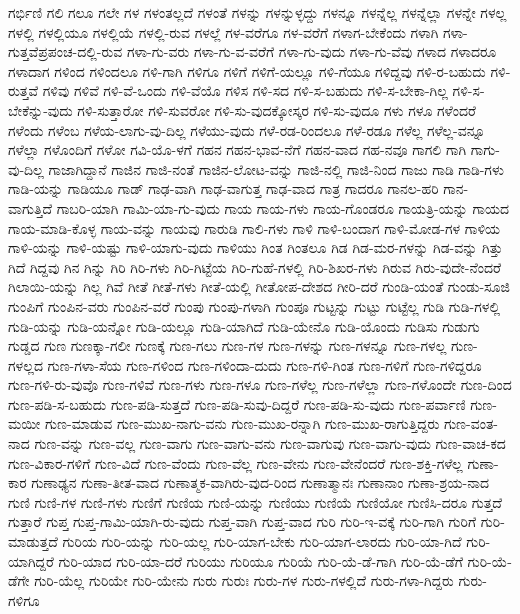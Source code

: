 {ಗರ್ಭಿಣಿ
ಗಲಿ
ಗಲೂ
ಗಲೇ
ಗಳ
ಗಳಂತಲ್ಲದೆ
ಗಳಂತೆ
ಗಳನ್ನು
ಗಳನ್ನುಳ್ಳದ್ದು
ಗಳನ್ನೂ
ಗಳನ್ನೆಲ್ಲ
ಗಳನ್ನೆಲ್ಲಾ
ಗಳನ್ನೇ
ಗಳಲ್ಲ
ಗಳಲ್ಲಿ
ಗಳಲ್ಲಿಯೂ
ಗಳಲ್ಲಿಯೆ
ಗಳಲ್ಲಿ-ರುವ
ಗಳಲ್ಲೆ
ಗಳ-ವರೆಗೂ
ಗಳ-ವರೆಗೆ
ಗಳಾಗ-ಬೇಕೆಂದು
ಗಳಾಗಿ
ಗಳಾ-ಗುತ್ತವೆಪ್ರಪಂಚ-ದಲ್ಲಿ-ರುವ
ಗಳಾ-ಗು-ವರು
ಗಳಾ-ಗು-ವ-ವರೆಗೆ
ಗಳಾ-ಗು-ವುದು
ಗಳಾ-ಗು-ವೆವು
ಗಳಾದ
ಗಳಾದರೂ
ಗಳಾದಾಗ
ಗಳಿಂದ
ಗಳಿಂದಲೂ
ಗಳಿ-ಗಾಗಿ
ಗಳಿಗೂ
ಗಳಿಗೆ
ಗಳಿಗೆ-ಯಲ್ಲೂ
ಗಳಿ-ಗೆಯೂ
ಗಳಿದ್ದವು
ಗಳಿ-ರ-ಬಹುದು
ಗಳಿ-ರುತ್ತವೆ
ಗಳಿವು
ಗಳಿವೆ
ಗಳಿ-ವೆ-ಒಂದು
ಗಳಿ-ವೆಯೊ
ಗಳಿಸ
ಗಳಿ-ಸದ
ಗಳಿ-ಸ-ಬಹುದು
ಗಳಿ-ಸ-ಬೇಕಾ-ಗಿಲ್ಲ
ಗಳಿ-ಸ-ಬೇಕೆನ್ನು-ವುದು
ಗಳಿ-ಸುತ್ತಾರೋ
ಗಳಿ-ಸುವರೋ
ಗಳಿ-ಸು-ವುದಕ್ಕೋಸ್ಕರ
ಗಳಿ-ಸು-ವುದೂ
ಗಳು
ಗಳೂ
ಗಳೆಂದರೆ
ಗಳೆಂದು
ಗಳೆಂಬ
ಗಳೆಯ-ಲಾಗು-ವು-ದಿಲ್ಲ
ಗಳೆಯು-ವುದು
ಗಳೆ-ರಡ-ರಿಂದಲೂ
ಗಳೆ-ರಡೂ
ಗಳೆಲ್ಲ
ಗಳೆಲ್ಲ-ವನ್ನೂ
ಗಳೆಲ್ಲಾ
ಗಳೊಂದಿಗೆ
ಗಳೋ
ಗವಿ-ಯೊ-ಳಗೆ
ಗಹನ
ಗಹನ-ಭಾವ-ನೆಗೆ
ಗಹನ-ವಾದ
ಗಹ-ನವೂ
ಗಾಗಲಿ
ಗಾಗಿ
ಗಾಗು-ವು-ದಿಲ್ಲ
ಗಾಜಾಗಿದ್ದಾನೆ
ಗಾಜಿನ
ಗಾಜಿ-ನಂತೆ
ಗಾಜಿನ-ಲೋಟ-ವನ್ನು
ಗಾಜಿ-ನಲ್ಲಿ
ಗಾಜಿ-ನಿಂದ
ಗಾಜು
ಗಾಡಿ
ಗಾಡಿ-ಗಳು
ಗಾಡಿ-ಯನ್ನು
ಗಾಡಿಯೂ
ಗಾಡ್
ಗಾಢ-ವಾಗಿ
ಗಾಢ-ವಾಗುತ್ತ
ಗಾಢ-ವಾದ
ಗಾತ್ರ
ಗಾದರೂ
ಗಾನಲ-ಹರಿ
ಗಾನ-ವಾಗುತ್ತಿದೆ
ಗಾಬರಿ-ಯಾಗಿ
ಗಾಮಿ-ಯಾ-ಗು-ವುದು
ಗಾಯ
ಗಾಯ-ಗಳು
ಗಾಯ-ಗೊಂಡರೂ
ಗಾಯತ್ರಿ-ಯನ್ನು
ಗಾಯದ
ಗಾಯ-ಮಾಡಿ-ಕೊಳ್ಳ
ಗಾಯ-ವನ್ನು
ಗಾಯವು
ಗಾರುಡಿ
ಗಾಲಿ-ಗಳು
ಗಾಳಿ
ಗಾಳಿ-ಬಂದಾಗ
ಗಾಳಿ-ಮೋಡ-ಗಳ
ಗಾಳಿಯ
ಗಾಳಿ-ಯನ್ನು
ಗಾಳಿ-ಯಷ್ಟು
ಗಾಳಿ-ಯಾಗು-ವುದು
ಗಾಳಿಯು
ಗಿಂತ
ಗಿಂತಲೂ
ಗಿಡ
ಗಿಡ-ಮರ-ಗಳನ್ನು
ಗಿಡ-ವನ್ನು
ಗಿತ್ತು
ಗಿದೆ
ಗಿದ್ದವು
ಗಿನ
ಗಿನ್ನು
ಗಿರಿ
ಗಿರಿ-ಗಳು
ಗಿರಿ-ಗಿಟ್ಟೆಯ
ಗಿರಿ-ಗುಹೆ-ಗಳಲ್ಲಿ
ಗಿರಿ-ಶಿಖರ-ಗಳು
ಗಿರುವ
ಗಿರು-ವುದೇ-ನೆಂದರೆ
ಗಿಲಾಯಿ-ಯನ್ನು
ಗಿಲ್ಲ
ಗಿವೆ
ಗೀತೆ
ಗೀತೆ-ಗಳು
ಗೀತೆ-ಯಲ್ಲಿ
ಗೀತೋಪ-ದೇಶದ
ಗೀರಿ-ದರೆ
ಗುಂಡಿ-ಯಂತೆ
ಗುಂಡು-ಸೂಜಿ
ಗುಂಪಿಗೆ
ಗುಂಪಿನ-ವರು
ಗುಂಪಿನ-ವರೆ
ಗುಂಪು
ಗುಂಪು-ಗಳಾಗಿ
ಗುಂಪೂ
ಗುಟ್ಟನ್ನು
ಗುಟ್ಟು
ಗುಟ್ಟೆಲ್ಲ
ಗುಡಿ
ಗುಡಿ-ಗಳಲ್ಲಿ
ಗುಡಿ-ಯನ್ನು
ಗುಡಿ-ಯನ್ನೋ
ಗುಡಿ-ಯಲ್ಲೂ
ಗುಡಿ-ಯಾಗಿದೆ
ಗುಡಿ-ಯೇನೊ
ಗುಡಿ-ಯೊಂದು
ಗುಡಿಸು
ಗುಡುಗು
ಗುಡ್ಡದ
ಗುಣ
ಗುಣಕ್ಕಾ-ಗಲೀ
ಗುಣಕ್ಕೆ
ಗುಣ-ಗಲು
ಗುಣ-ಗಳ
ಗುಣ-ಗಳನ್ನು
ಗುಣ-ಗಳನ್ನೂ
ಗುಣ-ಗಳಲ್ಲ
ಗುಣ-ಗಳಲ್ಲದ
ಗುಣ-ಗಳಾ-ಸೆಯ
ಗುಣ-ಗಳಿಂದ
ಗುಣ-ಗಳಿಂದಾ-ದುದು
ಗುಣ-ಗಳಿ-ಗಿಂತ
ಗುಣ-ಗಳಿಗೆ
ಗುಣ-ಗಳಿದ್ದರೂ
ಗುಣ-ಗಳಿ-ರು-ವುವೊ
ಗುಣ-ಗಳಿವೆ
ಗುಣ-ಗಳು
ಗುಣ-ಗಳೂ
ಗುಣ-ಗಳೆಲ್ಲ
ಗುಣ-ಗಳೆಲ್ಲಾ
ಗುಣ-ಗಳೊಂದೇ
ಗುಣ-ದಿಂದ
ಗುಣ-ಪಡಿ-ಸ-ಬಹುದು
ಗುಣ-ಪಡಿ-ಸುತ್ತದೆ
ಗುಣ-ಪಡಿ-ಸುವು-ದಿದ್ದರೆ
ಗುಣ-ಪಡಿ-ಸು-ವುದು
ಗುಣ-ಪರ್ವಾಣಿ
ಗುಣ-ಮಯೀ
ಗುಣ-ಮಾಡುವ
ಗುಣ-ಮುಖ-ನಾಗು-ವನು
ಗುಣ-ಮುಖ-ರನ್ನಾಗಿ
ಗುಣ-ಮುಖ-ರಾಗುತ್ತಿದ್ದರು
ಗುಣ-ವಂತ-ನಾದ
ಗುಣ-ವನ್ನು
ಗುಣ-ವಲ್ಲ
ಗುಣ-ವಾಗು
ಗುಣ-ವಾಗು-ವನು
ಗುಣ-ವಾಗುವು
ಗುಣ-ವಾಗು-ವುದು
ಗುಣ-ವಾಚ-ಕದ
ಗುಣ-ವಿಕಾರ-ಗಳಿಗೆ
ಗುಣ-ವಿದೆ
ಗುಣ-ವೆಂದು
ಗುಣ-ವೆಲ್ಲ
ಗುಣ-ವೇನು
ಗುಣ-ವೇನೆಂದರೆ
ಗುಣ-ಶಕ್ತಿ-ಗಳೆಲ್ಲ
ಗುಣಾ-ಕಾರ
ಗುಣಾಢ್ಯನ
ಗುಣಾ-ತೀತ-ವಾದ
ಗುಣಾತ್ಮಕ-ವಾಗಿರು-ವುದ-ರಿಂದ
ಗುಣಾತ್ಮಾನಃ
ಗುಣಾನಾಂ
ಗುಣಾ-ಶ್ರಯ-ನಾದ
ಗುಣಿ
ಗುಣಿ-ಗಳ
ಗುಣಿ-ಗಳು
ಗುಣಿಗೆ
ಗುಣಿಯ
ಗುಣಿ-ಯನ್ನು
ಗುಣಿಯು
ಗುಣಿಯೆ
ಗುಣಿಯೋ
ಗುಣಿಸಿ-ದರೂ
ಗುತ್ತದೆ
ಗುತ್ತಾರೆ
ಗುಪ್ತ
ಗುಪ್ತ-ಗಾಮಿ-ಯಾಗಿ-ರು-ವುದು
ಗುಪ್ತ-ವಾಗಿ
ಗುಪ್ತ-ವಾದ
ಗುರಿ
ಗುರಿ-ಇ-ವಕ್ಕೆ
ಗುರಿ-ಗಾಗಿ
ಗುರಿಗೆ
ಗುರಿ-ಮಾಡುತ್ತದೆ
ಗುರಿಯ
ಗುರಿ-ಯನ್ನು
ಗುರಿ-ಯಲ್ಲ
ಗುರಿ-ಯಾಗ-ಬೇಕು
ಗುರಿ-ಯಾಗ-ಲಾರದು
ಗುರಿ-ಯಾ-ಗಿದೆ
ಗುರಿ-ಯಾಗಿದ್ದರೆ
ಗುರಿ-ಯಾದ
ಗುರಿ-ಯಾ-ದರೆ
ಗುರಿಯು
ಗುರಿಯೂ
ಗುರಿಯೆ
ಗುರಿ-ಯೆ-ಡೆ-ಗಾಗಿ
ಗುರಿ-ಯೆ-ಡೆಗೆ
ಗುರಿ-ಯೆ-ಡೆಗೇ
ಗುರಿ-ಯೆಲ್ಲ
ಗುರಿಯೇ
ಗುರಿ-ಯೇನು
ಗುರು
ಗುರುಃ
ಗುರು-ಗಳ
ಗುರು-ಗಳಲ್ಲಿದೆ
ಗುರು-ಗಳಾ-ಗಿದ್ದರು
ಗುರು-ಗಳಿಗೂ
}
